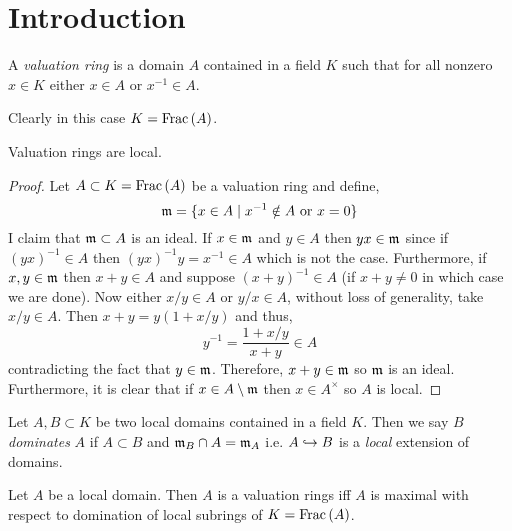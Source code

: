 \documentclass[12pt]{article}
\begin{document}
\section{Introduction}

\begin{defn}
A \textit{valuation ring} is a domain $A$ contained in a field $K$ such that for all nonzero $x \in K$ either $x \in A$ or $x^{-1} \in A$.
\end{defn}

\begin{rmk}
Clearly in this case $K = \mathrm{Frac}\left(A\right)$.
\end{rmk}

\begin{prop}
Valuation rings are local.
\end{prop}

\begin{proof}
Let $A \subset K = \mathrm{Frac}\left(A\right)$ be a valuation ring and define,
\[ \mathfrak{m} = \{ x \in A \mid x^{-1} \notin A \text{ or } x = 0 \} \]
I claim that $\mathfrak{m} \subset A$ is an ideal. If $x \in \mathfrak{m}$ and $y \in A$ then $y x \in \mathfrak{m}$ since  if $(y x)^{-1} \in A$ then $(y x)^{-1} y = x^{-1} \in A$ which is not the case. Furthermore, if $x, y \in \mathfrak{m}$ then $x + y \in A$ and suppose $(x + y)^{-1} \in A$ (if $x + y \neq 0$ in which case we are done). Now either $x/y \in A$ or $y/x \in A$, without loss of generality, take $x/y \in A$. Then $x + y = y(1 + x/y)$ and thus,
\[ y^{-1} = \frac{1 + x / y}{x + y} \in A \]
contradicting the fact that $y \in \mathfrak{m}$. Therefore, $x + y \in \mathfrak{m}$ so $\mathfrak{m}$ is an ideal. Furthermore, it is clear that if $x \in A \setminus \mathfrak{m}$ then $x \in A^\times$ so $A$ is local.
\end{proof}

\begin{defn}
Let $A, B \subset K$ be two local domains contained in a field $K$. Then we say $B$ \textit{dominates} $A$ if $A \subset B$ and $\mathfrak{m}_B \cap A = \mathfrak{m}_A$ i.e. $A \hookrightarrow B$ is a \textit{local} extension of domains.
\end{defn}

\begin{prop}
Let $A$ be a local domain. Then $A$ is a valuation rings iff $A$ is maximal with respect to domination of local subrings of $K = \mathrm{Frac}\left(A\right)$.
\end{prop}
\end{document}

